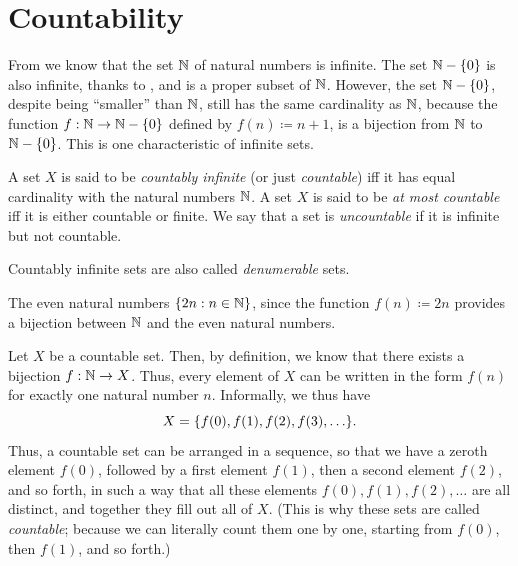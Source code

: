 \section{Countability}\label{i:sec:8.1}

\begin{note}
  From  we know that the set \(\mathbb{N}\) of natural numbers is infinite.
  The set \(\mathbb{N} - \left\lbrace0\right\rbrace\) is also infinite, thanks to , and is a proper subset of \(\mathbb{N}\).
  However, the set \(\mathbb{N} - \left\lbrace0\right\rbrace\), despite being ``smaller'' than \(\mathbb{N}\), still has the same cardinality as \(\mathbb{N}\), because the function \(f : \mathbb{N} \to \mathbb{N} - \left\lbrace0\right\rbrace\) defined by \(f(n) \coloneqq n + 1\), is a bijection from \(\mathbb{N}\) to \(\mathbb{N} - \left\lbrace0\right\rbrace\).
  This is one characteristic of infinite sets.
\end{note}

\begin{defn}\label{i:8.1.1}
  A set \(X\) is said to be \emph{countably infinite} (or just \emph{countable}) iff it has equal cardinality with the natural numbers \(\mathbb{N}\).
  A set \(X\) is said to be \emph{at most countable} iff it is either countable or finite.
  We say that a set is \emph{uncountable} if it is infinite but not countable.
\end{defn}

\begin{rmk}\label{i:8.1.2}
  Countably infinite sets are also called \emph{denumerable} sets.
\end{rmk}

\begin{eg}\label{i:8.1.3}
  The even natural numbers \(\left\lbrace2n : n \in \mathbb{N}\right\rbrace\), since the function \(f(n) \coloneqq 2n\) provides a bijection between \(\mathbb{N}\) and the even natural numbers.
\end{eg}

\begin{note}
  Let \(X\) be a countable set.
  Then, by definition, we know that there exists a bijection \(f : \mathbb{N} \to X\).
  Thus, every element of \(X\) can be written in the form \(f(n)\) for exactly one natural number \(n\).
  Informally, we thus have
  \[
    X = \set{f(0), f(1), f(2), f(3), \dots}.
  \]
  Thus, a countable set can be arranged in a sequence, so that we have a zeroth element \(f(0)\), followed by a first element \(f(1)\), then a second element \(f(2)\), and so forth, in such a way that all these elements \(f(0), f(1), f(2), \dots\) are all distinct, and together they fill out all of \(X\).
  (This is why these sets are called \emph{countable};
  because we can literally count them one by one, starting from \(f(0)\), then \(f(1)\), and so forth.)
\end{note}

